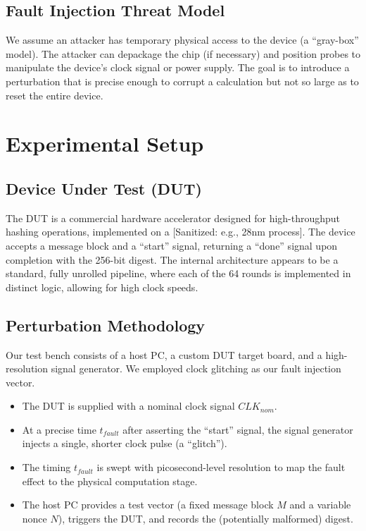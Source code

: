 \documentclass[11pt, a4paper]{article}
\begin{document}
\subsection{Fault Injection Threat Model}
We assume an attacker has temporary physical access to the device (a ``gray-box'' model). The attacker can depackage the chip (if necessary) and position probes to manipulate the device's clock signal or power supply. The goal is to introduce a perturbation that is precise enough to corrupt a calculation but not so large as to reset the entire device.

\section{Experimental Setup}
\subsection{Device Under Test (DUT)}
The DUT is a commercial hardware accelerator designed for high-throughput hashing operations, implemented on a [Sanitized: e.g., 28nm process]. The device accepts a message block and a ``start'' signal, returning a ``done'' signal upon completion with the 256-bit digest. The internal architecture appears to be a standard, fully unrolled pipeline, where each of the 64 rounds is implemented in distinct logic, allowing for high clock speeds.

\subsection{Perturbation Methodology}
Our test bench consists of a host PC, a custom DUT target board, and a high-resolution signal generator. We employed clock glitching as our fault injection vector.
\begin{itemize}
    \item The DUT is supplied with a nominal clock signal $CLK_{nom}$.
    \item At a precise time $t_{fault}$ after asserting the ``start'' signal, the signal generator injects a single, shorter clock pulse (a ``glitch'').
    \item The timing $t_{fault}$ is swept with picosecond-level resolution to map the fault effect to the physical computation stage.
    \item The host PC provides a test vector (a fixed message block $M$ and a variable nonce $N$), triggers the DUT, and records the (potentially malformed) digest.
\end{itemize}
\end{document}
